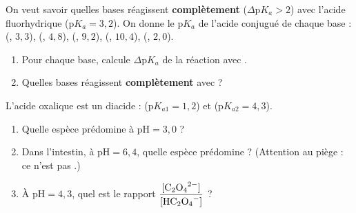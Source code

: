 \documentclass[11pt,a4paper]{article}
\begin{document}
\begin{exo}
On veut savoir quelles bases réagissent \textbf{complètement} ($\Delta\mathrm{p}K_a > 2$) avec l'acide
fluorhydrique  ($\mathrm{p}K_a = 3{,}2$). On donne le $\mathrm{p}K_a$ de l'acide conjugué de chaque base :
 (, $3{,}3$),  (, $4{,}8$),  (, $9{,}2$),
 (, $10{,}4$),  (, $2{,}0$).
\begin{enumerate}[label=\alph*)]
  \item Pour chaque base, calcule $\Delta\mathrm{p}K_a$ de la réaction avec .
  \item Quelles bases réagissent \textbf{complètement} avec  ?
\end{enumerate}
\end{exo}

\begin{exo}
L'acide oxalique  est un diacide :  ($\mathrm{p}K_{a1} = 1{,}2$) et
 ($\mathrm{p}K_{a2} = 4{,}3$).
\begin{enumerate}[label=\alph*)]
  \item Quelle espèce prédomine à $\mathrm{pH} = 3{,}0$ ?
  \item Dans l'intestin, à $\mathrm{pH} = 6{,}4$, quelle espèce prédomine ? (Attention au piège : ce n'est pas
        .)
  \item À $\mathrm{pH} = 4{,}3$, quel est le rapport $\dfrac{[\ce{C2O4^{2-}}]}{[\ce{HC2O4-}]}$ ?
\end{enumerate}
\end{exo}
\end{document}
